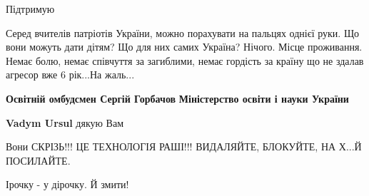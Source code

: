 \begin{itemize}
Підтримую

 

Серед вчителів патріотів України, можно порахувати на пальцях однієї руки. Що
вони можуть дати дітям? Що для них самих Україна? Нічого. Місце проживання.
Немає болю, немає співчуття за загиблими, немає гордість за країну що не здалав
агресор вже 6 рік...На жаль...


 
\textbf{Освітній омбудсмен Сергій Горбачов} \textbf{Міністерство освіти і науки України}

\begin{itemize}
 
\textbf{Vadym Ursul} дякую Вам
\end{itemize}

 
Вони СКРІЗЬ!!! ЦЕ ТЕХНОЛОГІЯ РАШІ!!! ВИДАЛЯЙТЕ, БЛОКУЙТЕ, НА Х...Й ПОСИЛАЙТЕ.

 
Ірочку - у дірочку.
Й змити!

\begin{itemize}
 

\end{itemize}
\end{itemize}
